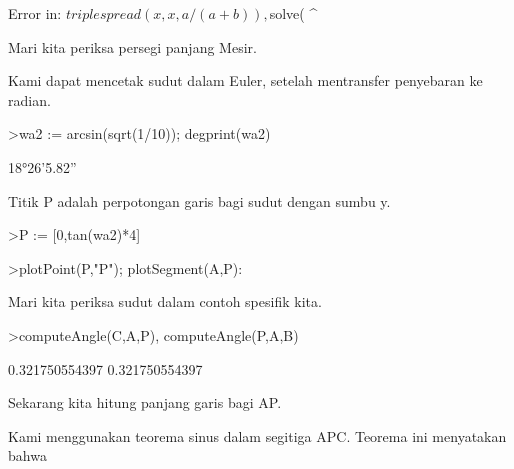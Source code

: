 \documentclass[a4paper,10pt]{article}
\begin{document}
\begin{eulernotebook}
\begin{eulercomment}
\begin{eulercomment}
\begin{eulercomment}
\begin{eulercomment}
\begin{eulercomment}
\begin{eulercomment}
\begin{eulercomment}
\begin{eulercomment}
\begin{eulercomment}
\begin{eulercomment}
\begin{eulercomment}
\begin{eulercomment}
\begin{eulercomment}
\begin{eulercomment}
\begin{eulercomment}
\begin{eulercomment}
\begin{euleroutput}
  Error in:
   $triplespread(x,x,a/(a+b)), $solve(%
                                         ^
\end{euleroutput}
\begin{eulercomment}
Mari kita periksa persegi panjang Mesir.
\end{eulercomment}
\begin{eulercomment}
Kami dapat mencetak sudut dalam Euler, setelah mentransfer penyebaran
ke radian.
\end{eulercomment}
\begin{eulerprompt}
>wa2 := arcsin(sqrt(1/10)); degprint(wa2)
\end{eulerprompt}
\begin{euleroutput}
  18°26'5.82''
\end{euleroutput}
\begin{eulercomment}
Titik P adalah perpotongan garis bagi sudut dengan sumbu y.
\end{eulercomment}
\begin{eulerprompt}
>P := [0,tan(wa2)*4]
\end{eulerprompt}
\begin{euleroutput}
  [0,  1.33333]
\end{euleroutput}
\begin{eulerprompt}
>plotPoint(P,"P"); plotSegment(A,P):
\end{eulerprompt}
\begin{eulercomment}
Mari kita periksa sudut dalam contoh spesifik kita.
\end{eulercomment}
\begin{eulerprompt}
>computeAngle(C,A,P), computeAngle(P,A,B)
\end{eulerprompt}
\begin{euleroutput}
  0.321750554397
  0.321750554397
\end{euleroutput}
\begin{eulercomment}
Sekarang kita hitung panjang garis bagi AP.

Kami menggunakan teorema sinus dalam segitiga APC. Teorema ini
menyatakan bahwa


\end{eulercomment}
\end{eulercomment}
\end{eulercomment}
\end{eulercomment}
\end{eulercomment}
\end{eulercomment}
\end{eulercomment}
\end{eulercomment}
\end{eulercomment}
\end{eulercomment}
\end{eulercomment}
\end{eulercomment}
\end{eulercomment}
\end{eulercomment}
\end{eulercomment}
\end{eulercomment}
\end{eulercomment}
\end{eulernotebook}
\end{document}

